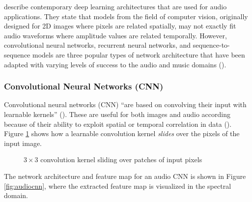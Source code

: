 \documentclass[report.tex]{subfiles}
\begin{document}
\textcite{audiodeeplearning} describe contemporary deep learning architectures that are used for audio applications. They state that models from the field of computer vision, originally designed for 2D images where pixels are related spatially, may not exactly fit audio waveforms where amplitude values are related temporally. However, convolutional neural networks, recurrent neural networks, and sequence-to-sequence models are three popular types of network architecture that have been adapted with varying levels of success to the audio and music domains (\cite{audiodeeplearning}).

\newpagefill

\subsubsection{Convolutional Neural Networks (CNN)}

Convolutional neural networks (CNN) ``are based on convolving their input with learnable kernels'' (\cite[3]{audiodeeplearning}). These are useful for both images and audio according because of their ability to exploit spatial or temporal correlation in data (\cite{cnns}). Figure \ref{fig:cnnbasic} shows how a learnable convolution kernel \textit{slides} over the pixels of the input image.

\begin{figure}[ht]
	\centering
	\hspace{0.15em}
	\caption{$3 \times 3$ convolution kernel sliding over patches of input pixels\protect\footnotemark}
	\label{fig:cnnbasic}
\end{figure}


The network architecture and feature map for an audio CNN is shown in Figure \ref{fig:audiocnn}, where the extracted feature map is visualized in the spectral domain.
\end{document}
